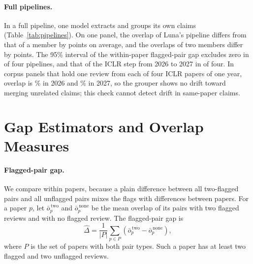 \documentclass[11pt]{article}
\begin{document}
\paragraph{Full pipelines.} In a full pipeline, one model extracts and groups its own claims (Table~\ref{tab:pipelines}). On one panel, the overlap of Luna's pipeline differs from that of a member by \RefPipeAbsDiffLuna{} points on average, and the overlaps of two members differ by \RefPipeAbsDiffCouncil{} points. The 95\% interval of the within-paper flagged-pair gap excludes zero in \RefPipePairGapSignificant{} of four pipelines, and that of the ICLR step from 2026 to 2027 in \RefPipeStepSignificant{} of four. In corpus panels that hold one review from each of four ICLR papers of one year, overlap is \CrossRecentLast\% in 2026 and \CrossLast\% in 2027, so the grouper shows no drift toward merging unrelated claims; this check cannot detect drift in same-paper claims.


\section{Gap Estimators and Overlap Measures}
\label{app:measures}

\paragraph{Flagged-pair gap.} We compare within papers, because a plain difference between all two-flagged pairs and all unflagged pairs mixes the flags with differences between papers. For a paper $p$, let $\bar{o}_p^{\,\mathrm{two}}$ and $\bar{o}_p^{\,\mathrm{none}}$ be the mean overlap of its pairs with two flagged reviews and with no flagged review. The flagged-pair gap is
\begin{equation}
 \hat{\Delta}=\frac{1}{|P|}\sum_{p\in P}\left(\bar{o}_p^{\,\mathrm{two}}-\bar{o}_p^{\,\mathrm{none}}\right),
\label{eq:gap}
\end{equation}
where $P$ is the set of papers with both pair types. Such a paper has at least two flagged and two unflagged reviews.
\end{document}

